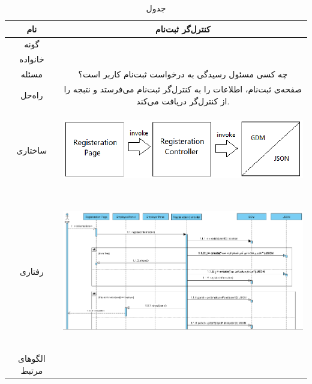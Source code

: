 \begin{table}[H]
	\begin{adjustbox}{width=\textwidth}
		\begin{tabular}{|c|c|}
			\hline
			نام &
			کنترل‌گر ثبت‌نام \\ 
			\hline
			گونه & 
			\grasp \\
			\hline
			خانواده &
			\controller \\
			\hline
			مسئله & 
			چه کسی مسئول رسیدگی به درخواست ثبت‌نام کاربر است؟\\
			\hline
			راه‌حل& 
			صفحه‌ی ثبت‌نام، اطلاعات را به کنترل‌گر ثبت‌‌نام می‌فرستد و نتبجه‌ را از کنترل‌گر دریافت می‌کند. \\
			\hline
			ساختاری & 
			\begin{minipage}{\textwidth}
				\begin{flushleft}
					\begin{minipage}{\textwidth}
						\includegraphics[width=13cm, height=2.7cm]{./images/7-7-1}
					\end{minipage}
				\end{flushleft}
			\end{minipage}
			
			\\
			\hline
			رفتاری & 
			\begin{minipage}{\textwidth}
				\begin{flushleft}
					\begin{minipage}{\textwidth}
						\includegraphics[width=13.5cm, height=6cm]{./images/7-7-2}
					\end{minipage}
				\end{flushleft}
			\end{minipage}
			\\
			\hline
			الگو‌های مرتبط& \\
			\hline
		\end{tabular}
	\end{adjustbox}
	\caption{جدول }
	\label{table-with-pic:7}
\end{table}

